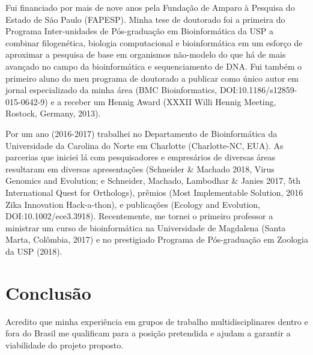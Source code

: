 \documentclass[10pt, a4paper, roman, twoside, top=0cm, bottom=0cm, headheight=0cm, footsep=0cm, footskip=0cm]{moderncv}        %
\begin{document}
{\setlength{\parindent}{2ex}

Fui financiado por mais de nove anos pela Fundação de Amparo à Pesquisa do Estado de São Paulo (FAPESP). Minha tese de doutorado foi a primeira do Programa Inter-unidades de Pós-graduação em Bioinformática da USP a combinar filogenética, biologia computacional e bioinformática em um esforço de aproximar a pesquisa de base em organismos não-modelo do que há de mais avançado no campo da bioinformática e sequenciamento de DNA. Fui também o primeiro aluno do meu programa de doutorado a publicar como único autor em jornal especializado da minha área (BMC Bioinformatics, DOI:10.1186/s12859-015-0642-9) e a receber um Hennig Award (XXXII Willi Hennig Meeting, Rostock, Germany, 2013).

Por um ano (2016-2017) trabalhei no Departamento de Bioinformática da Universidade da Carolina do Norte em Charlotte (Charlotte-NC, EUA). As parcerias que iniciei lá com pesquisadores e empresários de diversas áreas resultaram em diversas apresentações (Schneider \& Machado 2018, Virus Genomics and Evolution; e Schneider, Machado, Lambodhar \& Janies 2017, 5th International Quest for Orthologs), prêmios (Most Implementable Solution, 2016 Zika Innovation Hack-a-thon), e publicações (Ecology and Evolution, DOI:10.1002/ece3.3918). Recentemente, me tornei o primeiro professor a ministrar um curso de bioinformática na Universidade de Magdalena (Santa Marta, Colômbia, 2017) e no prestigiado Programa de Pós-graduação em Zoologia da USP (2018).
}

\vspace{-0.5em}

\section{Conclusão}

\vspace{-0.5em}

{\setlength{\parindent}{2ex}

Acredito que minha experiência em grupos de trabalho multidisciplinares dentro e fora do Brasil me qualificam para a posição pretendida e ajudam a garantir a viabilidade do projeto proposto.

}
%
\vspace{2em}
%
\makeletterclosing
%
\end{document}
